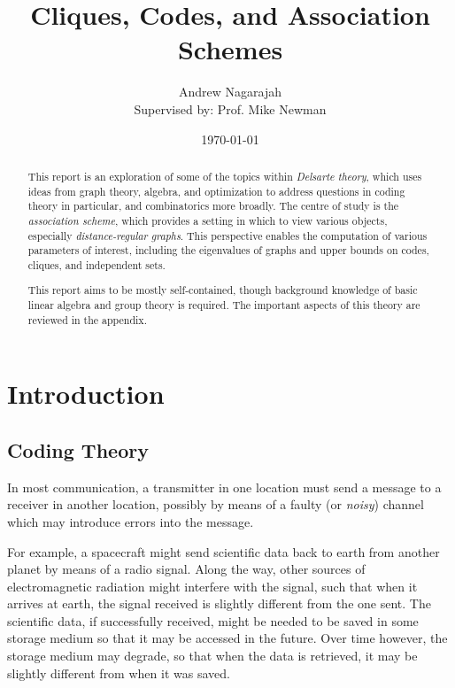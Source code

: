 \documentclass{report}
\title{Cliques, Codes, and Association Schemes}
\author{
  Andrew Nagarajah \\
  Supervised by: Prof. Mike Newman
}
\date{\today}
\begin{document}
\maketitle

\begin{abstract}

  This report is an exploration of some of the topics within \emph{Delsarte
  theory}, which uses ideas from graph theory, algebra, and optimization to
  address questions in coding theory in particular, and combinatorics more
  broadly.  The centre of study is the \emph{association scheme}, which provides
  a setting in which to view various objects, especially \emph{distance-regular
  graphs}.  This perspective enables the computation of various parameters of
  interest, including the eigenvalues of graphs and upper bounds on codes,
  cliques, and independent sets.

  This report aims to be mostly self-contained, though background knowledge of
  basic linear algebra and group theory is required.  The important aspects of
  this theory are reviewed in the appendix.

\end{abstract}

\tableofcontents

\chapter{Introduction}\label{ch:intro}
  \section{Coding Theory}\label{sec:intro:coding}
    In most communication, a transmitter in one location must send a message to
    a receiver in another location, possibly by means of a faulty (or
    \textit{noisy}) channel which may introduce errors into the message.

    For example, a spacecraft might send scientific data back to earth from
    another planet by means of a radio signal.  Along the way, other sources of
    electromagnetic radiation might interfere with the signal, such that when it
    arrives at earth, the signal received is slightly different from the one
    sent.
    The scientific data, if successfully received, might be needed to be saved in
    some storage medium so that it may be accessed in the future.  Over time
    however, the storage medium may degrade, so that when the data is retrieved,
    it may be slightly different from when it was saved.
\end{document}
